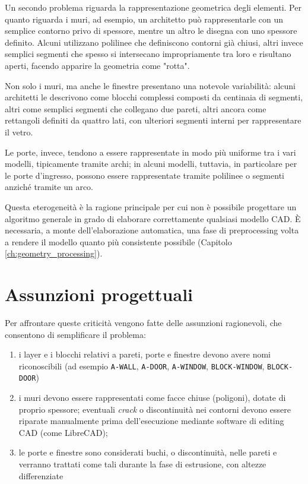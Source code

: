 Un secondo problema riguarda la rappresentazione geometrica degli elementi. Per quanto riguarda i muri, ad esempio, un architetto può rappresentarle con un semplice contorno privo di spessore, mentre un altro le disegna con uno spessore definito. Alcuni utilizzano polilinee che definiscono contorni già chiusi, altri invece semplici segmenti che spesso si intersecano impropriamente tra loro e risultano aperti, facendo apparire la geometria come "rotta".

Non solo i muri, ma anche le finestre presentano una notevole variabilità: alcuni architetti le descrivono come blocchi complessi composti da centinaia di segmenti, altri come semplici segmenti che collegano due pareti, altri ancora come rettangoli definiti da quattro lati, con ulteriori segmenti interni per rappresentare il vetro.

Le porte, invece, tendono a essere rappresentate in modo più uniforme tra i vari modelli, tipicamente tramite archi; in alcuni modelli, tuttavia, in particolare per le porte d'ingresso, possono essere rappresentate tramite polilinee o segmenti anziché tramite un arco.

Questa eterogeneità è la ragione principale per cui non è possibile progettare un algoritmo generale in grado di elaborare correttamente qualsiasi modello CAD. È necessaria, a monte dell'elaborazione automatica, una fase di preprocessing volta a rendere il modello quanto più consistente possibile (Capitolo \ref{ch:geometry_processing}).

\section{Assunzioni progettuali}
\label{sec:assunzioni_progettuali}

Per affrontare queste criticità vengono fatte delle assunzioni ragionevoli, che consentono di semplificare il problema:
\begin{enumerate}
	\item i layer e i blocchi relativi a pareti, porte e finestre devono avere nomi riconoscibili (ad esempio \texttt{A-WALL}, \texttt{A-DOOR}, \texttt{A-WINDOW}, \texttt{BLOCK-WINDOW}, \texttt{BLOCK-DOOR})
	\item i muri devono essere rappresentati come facce chiuse (poligoni), dotate di proprio spessore; eventuali \emph{crack} o discontinuità nei contorni devono essere riparate manualmente prima dell'esecuzione mediante software di editing CAD (come LibreCAD);
	\item le porte e finestre sono considerati buchi, o discontinuità,  nelle pareti e verranno trattati come tali durante la fase di estrusione, con altezze differenziate
\end{enumerate}